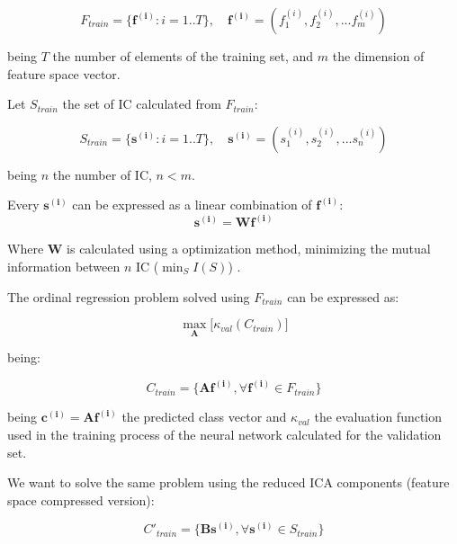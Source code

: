 \documentclass[preprint]{elsarticle}
\theoremstyle{definition} %
\theoremstyle{remark}
\begin{document}
\begin{equation}
	F_{train} = \{\boldsymbol{f^{(i)}} : i = 1 .. T\}, \quad \boldsymbol{f^{(i)}} = (f^{(i)}_1, f^{(i)}_2, ... f^{(i)}_m)
\end{equation}

being $T$ the number of elements of the training set, and $m$ the dimension of feature space vector.

Let $S_{train}$ the set of IC calculated from $F_{train}$:

\begin{equation}
	S_{train} = \{\boldsymbol{s^{(i)}} : i = 1 .. T\}, \quad \boldsymbol{s^{(i)}} = (s^{(i)}_1, s^{(i)}_2, ... s^{(i)}_n)
\end{equation}

being $n$ the number of IC, $n < m$.

Every $\boldsymbol{s^{(i)}}$ can be expressed as a linear combination of $\boldsymbol{f^{(i)}}$:
\begin{equation}
\boldsymbol{s^{(i)}} = \boldsymbol{W} \boldsymbol{f^{(i)}}
\end{equation}

Where $\boldsymbol{W}$ is calculated using a optimization method, minimizing the mutual information between $n$ IC ($\min_{S} I(S)$) \citep{hyvarinen1999fast}.

The ordinal regression problem solved using $F_{train}$ can be expressed as:

\begin{equation}
\max_{\boldsymbol{A}} \big[ \kappa_{val} (C_{train}) \big]
\end{equation}

being:

\begin{equation}
C_{train} = \{ \boldsymbol{A} \boldsymbol{f^{(i)}}, \forall \boldsymbol{f^{(i)}} \in F_{train} \} 
\end{equation}


being $\boldsymbol{c^{(i)}} = \boldsymbol{A} \boldsymbol{f^{(i)}}$ the predicted class vector and $\kappa_{val}$ the evaluation function used in the training process of the neural network calculated for the validation set.

We want to solve the same problem using the reduced ICA components (feature space compressed version):

\begin{equation}
C'_{train} = \{ \boldsymbol{B} \boldsymbol{s^{(i)}}, \forall \boldsymbol{s^{(i)}} \in S_{train} \} 
\end{equation}
\end{document}
